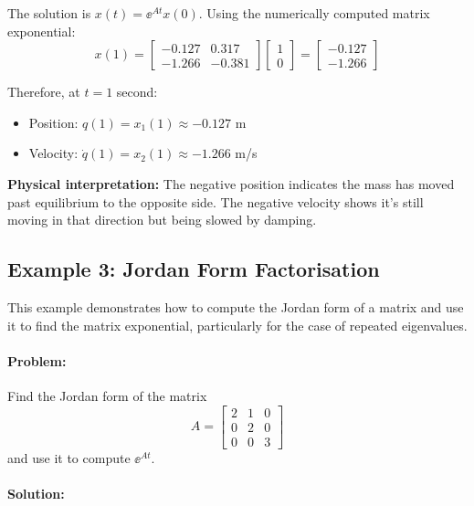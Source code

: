 \documentclass[11pt,a4paper]{article}
\begin{document}
The solution is $x(t) = \ee^{At}x(0)$. Using the numerically computed matrix exponential:
\begin{equation}
	x(1) = \begin{bmatrix} -0.127 & 0.317 \\ -1.266 & -0.381 \end{bmatrix}\begin{bmatrix} 1 \\ 0 \end{bmatrix} = \begin{bmatrix} -0.127 \\ -1.266 \end{bmatrix}
\end{equation}

Therefore, at $t = 1$ second:
\begin{itemize}
\item Position: $q(1) = x_1(1) \approx -0.127$ m
\item Velocity: $\dot{q}(1) = x_2(1) \approx -1.266$ m/s
\end{itemize}

\textbf{Physical interpretation:} The negative position indicates the mass has moved past equilibrium to the opposite side. The negative velocity shows it's still moving in that direction but being slowed by damping.


\subsection{Example 3: Jordan Form Factorisation}

This example demonstrates how to compute the Jordan form of a matrix and use it to find the matrix exponential, particularly for the case of repeated eigenvalues.

\paragraph{Problem:}
Find the Jordan form of the matrix
\begin{equation}
	A = \begin{bmatrix} 2 & 1 & 0 \\ 0 & 2 & 0 \\ 0 & 0 & 3 \end{bmatrix}
\end{equation}
and use it to compute $\ee^{At}$.

\paragraph{Solution:}
\end{document}
